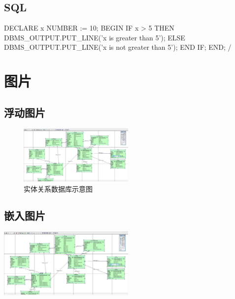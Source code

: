 \documentclass[11pt, a4paper, oneside, fontset=none]{ctexbook}
\begin{document}
\section{SQL}
\begin{plsql}[caption=PL/SQL程序1]
    DECLARE
    x NUMBER := 10;
    BEGIN
    IF x > 5 THEN
    DBMS_OUTPUT.PUT_LINE('x is greater than 5');
    ELSE
    DBMS_OUTPUT.PUT_LINE('x is not greater than 5');
    END IF;
    END;
    /
\end{plsql}

\chapter{图片}
\section{浮动图片}
\begin{figure}[htbp]
  \center
  \includegraphics[width=0.5\textwidth]{picture/实体关系数据库示意图.png}
  \caption{实体关系数据库示意图}
  \label{fig:relationDatabase}
\end{figure}
\section{嵌入图片}
\includegraphics[width=0.5\textwidth]{picture/实体关系数据库示意图.png}
\end{document}
